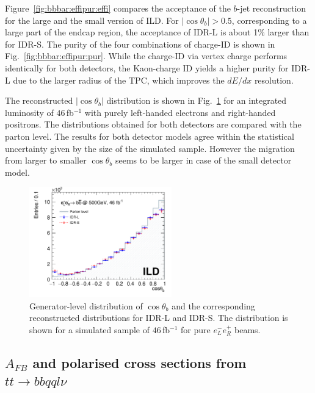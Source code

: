 Figure~\ref{fig:bbbar:effipur:effi} compares the acceptance of the $b$-jet reconstruction for the large and the small version of ILD.
For $|\cos{\theta_b}|>0.5$, corresponding to a large part of the endcap 
region, the acceptance of IDR-L is about 1\% larger than for IDR-S. The purity of the four combinations of charge-ID is shown in Fig.~\ref{fig:bbbar:effipur:pur}. While the charge-ID via vertex charge performs identically for both detectors, the Kaon-charge ID yields a higher purity for IDR-L due to the larger radius of the TPC, which improves the $dE/dx$ resolution. 

The reconstructed  $|\cos{\theta_b}|$ distribution is shown in Fig.~\ref{fig:bbbar:result} for an integrated luminosity of $46$\,fb$^{-1}$ with purely left-handed electrons and right-handed positrons. The distributions obtained for both detectors are compared with the parton level. The results for both detector models agree within the statistical uncertainty given by the size of the simulated sample. However the migration from larger to smaller $\cos{\theta_b}$ seems to be larger in case of the small detector model.


\begin{figure}[htbp]
\begin{center} \includegraphics[width=0.55\textwidth]{Performance/fig/result2models_v3.pdf}
\end{center}
\caption{Generator-level distribution of $\cos{\theta_b}$ and the corresponding reconstructed distributions for IDR-L and IDR-S. The distribution is shown for a simulated sample of $46$\,fb$^{-1}$ for pure $e^-_L e^+_R$ beams.}
\label{fig:bbbar:result}
\end{figure}

\subsection{\texorpdfstring{$A_{FB}$ and polarised cross sections from $tt \to bb qql\nu$}{AFB and ALR from tt -> bbqqlv}}
\label{subsec:bench:ttbar}

